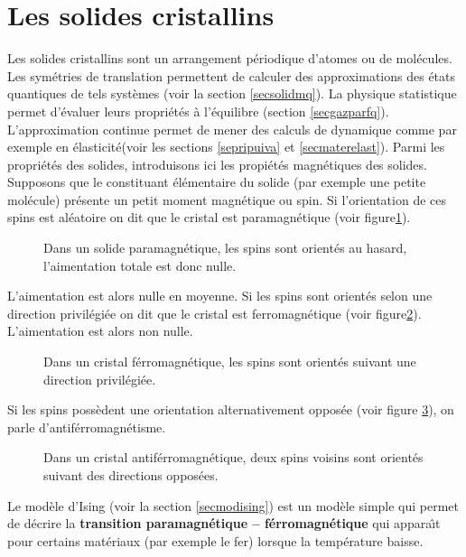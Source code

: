 \documentclass[12pt]{book}
\begin{document}
\section{Les solides cristallins}
Les solides cristallins \cite{ph:solid:Kittel67,ph:solid:Ashcroft76}
sont un arrangement p\'eriodique d'atomes ou de 
mol\'ecules. Les sym\'etries de translation permettent de calculer des
approximations des \'etats quantiques de tels syst\`emes (voir la section
\ref{secsolidmq}). La physique
statistique permet d'\'evaluer leurs propri\'et\'es \`a l'\'equilibre (section
\ref{secgazparfq}).
L'approximation continue permet de mener des calculs de dynamique comme
par exemple en \'elasticit\'e(voir les sections \ref{sepripuiva} et
\ref{secmaterelast}).  
Parmi les propri\'et\'es des solides, introduisons ici les
propi\'et\'es magn\'etiques des solides.
Supposons que le constituant \'el\'ementaire du solide (par exemple
une petite mol\'ecule) pr\'esente un petit moment magn\'etique ou spin. Si
l'orientation de ces spins est al\'eatoire on dit que le cristal est
paramagn\'etique (voir figure\ref{figparamag}). 
\begin{figure}[htb]
 \centerline{}   
 \caption{Dans un solide paramagn\'etique, les spins sont orient\'es
au hasard, l'aimentation totale est donc nulle.}
 \label{figparamag}
\end{figure}
L'aimentation est alors
nulle en moyenne. Si les spins sont orient\'es selon une direction
privil\'egi\'ee on dit que le cristal est ferromagn\'etique  (voir
figure\ref{figferromag}). 
L'aimentation est alors non nulle.
\begin{figure}[htb]
 \centerline{}   
 \caption{Dans un cristal f\'erromagn\'etique, les spins sont
orient\'es suivant une direction privil\'egi\'ee.}
 \label{figferromag}
\end{figure}
Si les spins poss\`edent une orientation alternativement oppos\'ee
(voir figure \ref{figantiferromag}), on parle d'antif\'erromagn\'etisme.
\begin{figure}[htb]
 \centerline{}   
 \caption{Dans un cristal antif\'erromagn\'etique, deux spins voisins sont
orient\'es suivant des directions oppos\'ees.}
 \label{figantiferromag}
\end{figure}
Le mod\`ele d'Ising (voir la section \ref{secmodising}) est un mod\`ele simple
qui permet de d\'ecrire la 
{\bf transition paramagn\'etique -- f\'erromagn\'etique} qui appara\^\i t
pour certains mat\'eriaux (par exemple le fer) lorsque la temp\'erature baisse.
\end{document}
